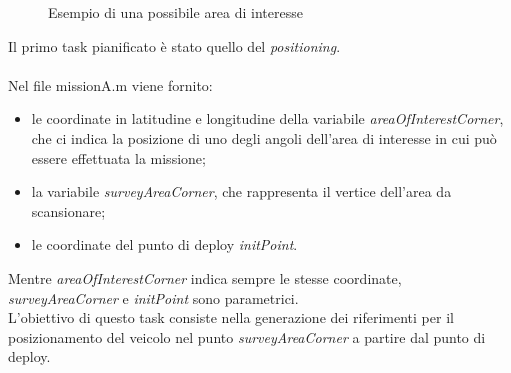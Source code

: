 \documentclass{article}
\begin{document}
                \begin{figure} [ht]
                        \caption{Esempio di una possibile area di interesse}
                        \label{fig:area}
                \end{figure}
                    
                Il primo task pianificato è stato quello del \emph{positioning}.\\ 
                \\
                Nel file missionA.m viene fornito:\\
                \begin{itemize}
                    \item le coordinate in latitudine e longitudine  della variabile \emph{areaOfInterestCorner}, che ci indica la posizione di uno degli angoli dell'area
                    di interesse in cui può essere effettuata la missione;\\
                    \item la variabile \emph{surveyAreaCorner}, che rappresenta il vertice dell'area da scansionare;\\
                    \item le coordinate del punto di deploy \emph{initPoint}.\\ 
                \end{itemize}
                Mentre \emph{areaOfInterestCorner} indica sempre le stesse coordinate, \emph{surveyAreaCorner} e \emph{initPoint} sono parametrici.\\
                L'obiettivo di questo task consiste nella generazione dei riferimenti per il posizionamento del veicolo nel punto \emph{surveyAreaCorner}
                a partire dal punto di deploy.\\
\end{document}
